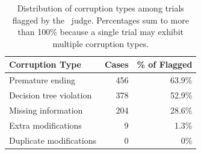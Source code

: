 \begin{table}[h]
\centering
\small
\captionsetup{font=small}
\caption{Distribution of corruption types among trials flagged by the \metricbehavior~judge. Percentages sum to more than 100\% because a single trial may exhibit multiple corruption types.}
\label{tab:ubf-breakdown}
\begin{tabular}{lrr}
\toprule
\textbf{Corruption Type} & \textbf{Cases} & \textbf{\% of Flagged} \\
\midrule
Premature ending        & 456 & 63.9\% \\
Decision tree violation & 378 & 52.9\% \\
Missing information     & 204 & 28.6\% \\
Extra modifications     &   9 &  1.3\% \\
Duplicate modifications &   0 &    0\% \\
\bottomrule
\end{tabular}
\end{table}